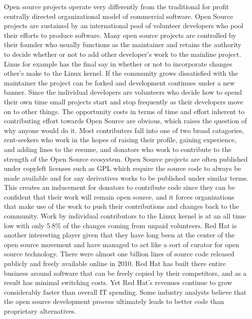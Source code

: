 Open source projects operate very differently from the traditional for profit centrally directed organizational model of commercial software. Open Source projects are sustained by an international pool of volunteer developers who pool their efforts to produce software.\autocite[191]{buxmann2012software}
Many open source projects are controlled by their founder who usually functions as the maintainer and retains the authority to decide whether or not to add other developer's work to the mainline project. Linus for example has the final say in whether or not to incorporate changes other's make to the Linux kernel. If the community grows dissatisfied with the maintainer the project can be forked and development continues under a new banner. Since the individual developers are volunteers who decide how to spend their own time small projects start and stop frequently as their developers move on to other things.\autocite[197]{buxmann2012software}
The opportunity costs in terms of time and effort inherent to contributing effort towards Open Source are obvious, which raises the question of why anyone would do it. Most contributers fall into one of two broad catagories, rent-seekers who work in the hopes of raising their profile, gaining experience, and adding lines to the resume, and donators who work to contribute to the strength of the Open Source ecosystem.\autocite[198]{buxmann2012software}
Open Source projects are often published under copyleft licenses such as GPL which require the source code to always be made available and for any derivatives works to be published under similar terms. This creates an inducement for donators to contribute code since they can be confident that their work will remain open source, and it forces organizations that make use of the work to push their contributions and changes back to the community.\autocite[198]{buxmann2012software}
Work by individual contributors to the Linux kernel is at an all time low with only 5.8\% of the changes coming from unpaid volunteers.\autocite[]{KernelDevelopment2015}
Red Hat is another interesting player given that they have long been at the center of the open source movement and have managed to act like a sort of curator for open source technology.\autocite[]{OptimismInnovation}
There were almost one billion lines of source code released publicly and freely available online in 2010.\autocite[]{OptimismInnovation}
Red Hat has built there entire business around software that can be freely copied by their competitors, and as a result has minimal switching costs. Yet Red Hat's revenues continue to grow considerably faster than overall IT spending.\autocite[]{OptimismInnovation}
Some industry analysts believe that the open source development process ultimately leads to better code than proprietary alternatives.\autocite[]{OptimismInnovation}

